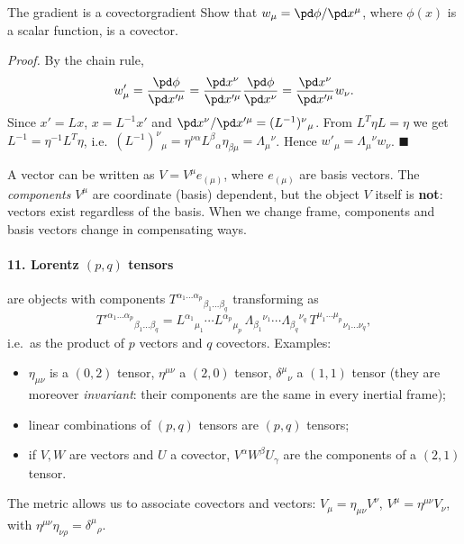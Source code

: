 \begin{example}{The gradient is a covector}{gradient}
Show that $w_\mu=\pd\phi/\pd x^\mu$, where $\phi(x)$ is a scalar function, is a covector.

\textit{Proof.} By the chain rule,
\[
  w'_\mu=\frac{\pd\phi}{\pd x'^\mu}=\frac{\pd x^\nu}{\pd x'^\mu}\frac{\pd\phi}{\pd x^\nu}=\frac{\pd x^\nu}{\pd x'^\mu}w_\nu .
\]
Since $x'=Lx$, $x=L^{-1}x'$ and $\pd x^\nu/\pd x'^\mu=(L^{-1})^\nu{}_\mu$. From $L^T\eta L=\eta$ we get $L^{-1}=\eta^{-1}L^T\eta$, i.e.\ $(L^{-1})^\nu{}_\mu=\eta^{\nu\alpha}L^\beta{}_\alpha\eta_{\beta\mu}=\Lambda_\mu{}^\nu$. Hence $w'_\mu=\Lambda_\mu{}^\nu w_\nu$. $\blacksquare$
\end{example}

\begin{remarkbox}
A vector can be written as $V=V^\mu e_{(\mu)}$, where $e_{(\mu)}$ are basis vectors. The \emph{components} $V^\mu$ are coordinate (basis) dependent, but the object $V$ itself is \textbf{not}: vectors exist regardless of the basis. When we change frame, components and basis vectors change in compensating ways.
\end{remarkbox}

\paragraph{11. Lorentz $(p,q)$ tensors} are objects with components $T^{\alpha_1\dots\alpha_p}{}_{\beta_1\dots\beta_q}$ transforming as
\begin{equation}
  T'^{\alpha_1\dots\alpha_p}{}_{\beta_1\dots\beta_q}=
  L^{\alpha_1}{}_{\mu_1}\cdots L^{\alpha_p}{}_{\mu_p}\,
  \Lambda_{\beta_1}{}^{\nu_1}\cdots\Lambda_{\beta_q}{}^{\nu_q}\,
  T^{\mu_1\dots\mu_p}{}_{\nu_1\dots\nu_q},
\end{equation}
i.e.\ as the product of $p$ vectors and $q$ covectors. Examples:
\begin{itemize}[nosep]
  \item $\eta_{\mu\nu}$ is a $(0,2)$ tensor, $\eta^{\mu\nu}$ a $(2,0)$ tensor, $\delta^\mu{}_\nu$ a $(1,1)$ tensor (they are moreover \emph{invariant}: their components are the same in every inertial frame);
  \item linear combinations of $(p,q)$ tensors are $(p,q)$ tensors;
  \item if $V,W$ are vectors and $U$ a covector, $V^\alpha W^\beta U_\gamma$ are the components of a $(2,1)$ tensor.
\end{itemize}
The metric allows us to associate covectors and vectors: $V_\mu=\eta_{\mu\nu}V^\nu$, $V^\mu=\eta^{\mu\nu}V_\nu$, with $\eta^{\mu\nu}\eta_{\nu\rho}=\delta^\mu{}_\rho$.

